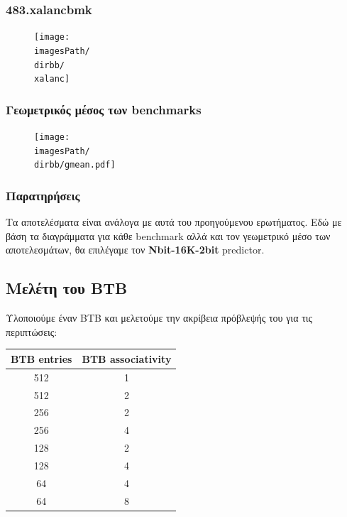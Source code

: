 \documentclass[12pt,a4paper]{article}
\newcommand{\imagesPath}{/home/nick/arch-ntua/ex02/graphs}
\newcommand{\xalanc}{483.xalancbmk.cslab_branch_predictors.out.pdf}
\newcommand{\dirbb}{4.2/ii}
\begin{document}
				\subsubsection{483.xalancbmk}
					\begin{figure}[H]
						\begin{center}
							 \texttt{[image: \\imagesPath/\\dirbb/\\xalanc]}
						\end{center}
					\end{figure}
				
				\subsubsection{Γεωμετρικός μέσος των benchmarks} 
				
				\begin{figure}[H]
					\begin{center}
						\texttt{[image: \\imagesPath/\\dirbb/gmean.pdf]}
					\end{center}
				\end{figure}
			
				\subsubsection{Παρατηρήσεις}
					Τα αποτελέσματα είναι ανάλογα με αυτά του προηγούμενου ερωτήματος. Εδώ με βάση τα διαγράμματα για κάθε benchmark αλλά και τον γεωμετρικό μέσο των αποτελεσμάτων, θα επιλέγαμε τον \textbf{Nbit-16K-2bit} predictor.
				
		\subsection{Μελέτη του BTB}
			Υλοποιούμε έναν BTB και μελετούμε την ακρίβεια πρόβλεψής του για τις περιπτώσεις:
			
			\begin{center}
				\begin{tabular}{|c|c|}
					\hline
					\textbf{BTB entries} & \textbf{BTB associativity} \\ \hline
					512 & 1 \\ \hline
					512 & 2 \\ \hline
					256 & 2 \\ \hline
					256 & 4 \\ \hline
					128 & 2 \\ \hline
					128 & 4 \\ \hline
					64  & 4 \\ \hline
					64  & 8 \\ \hline
				\end{tabular}
			\end{center}
			
\end{document}

